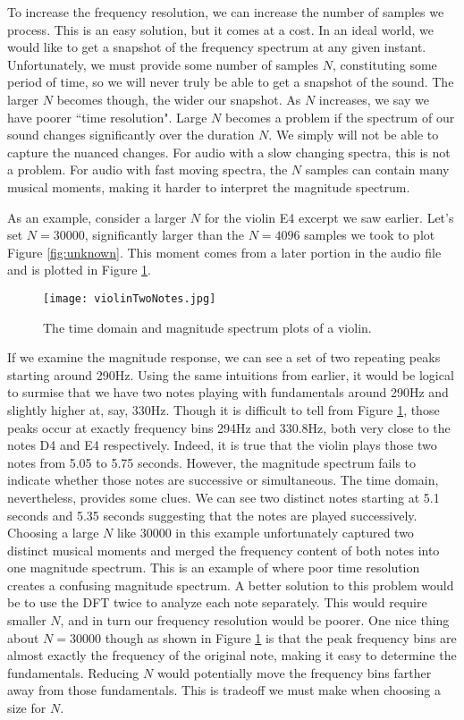 To increase the frequency resolution, we can increase the number of samples we process.  This is an easy solution,
but it comes at a cost.  In an ideal world, we would like to get a snapshot of the frequency spectrum at any given
instant.  Unfortunately, we must provide some number of samples $N$, constituting some period of time, so we
will never truly be able to get a snapshot of the sound.  The larger $N$ becomes though, the wider our snapshot.  
As $N$ increases, we say we have poorer ``time resolution".  Large $N$ becomes a problem if the spectrum of
our sound changes significantly over the duration $N$.  We simply will not be able to capture the nuanced changes.
For audio with a slow changing spectra, this is not a problem.  For audio with fast moving
spectra, the $N$ samples can contain many musical moments, making it harder to interpret the magnitude
spectrum.

As an example, consider a larger $N$ for the violin E4 excerpt we saw earlier.  Let's set $N =30000$, significantly larger
than the $N = 4096$ samples we took to plot Figure \ref{fig:unknown}.  This moment comes from a later portion in
the audio file and is plotted in Figure \ref{fig:violinTwoNotes}.

\begin{figure}[h]
	\caption{The time domain and magnitude spectrum plots of a violin.}
	\label{fig:violinTwoNotes}
	\begin{center}
		\texttt{[image: violinTwoNotes.jpg]}
	\end{center}
\end{figure}

If we examine the magnitude response, we can see a set of two repeating peaks starting around 290Hz.  Using the
same intuitions from earlier, it would be logical to surmise that we have two notes playing with fundamentals around
290Hz and slightly higher at, say, 330Hz.  Though it is difficult to tell from Figure \ref{fig:violinTwoNotes}, those peaks
occur at exactly frequency bins 294Hz and 330.8Hz, both very close to the notes D4 and E4 respectively.  Indeed, it is
true that the violin plays those two notes from 5.05 to 5.75 seconds.  However, the magnitude spectrum fails
to indicate whether those notes are successive or simultaneous.  
The time domain, nevertheless, provides some clues.  We 
can see two distinct notes starting at 5.1 seconds and 5.35 seconds suggesting 
that the notes are played successively.  Choosing a large $N$ like 30000 in this example
unfortunately captured two distinct musical moments and merged the frequency content of both notes into one 
magnitude spectrum.  This is an example of where poor time resolution creates a confusing magnitude spectrum.  
A better
solution to this problem would be to use the DFT twice to analyze each note separately.  This would require smaller $N$,
and in turn our frequency resolution would be poorer.  One nice thing about $N = 30000$ though as shown in 
Figure \ref{fig:violinTwoNotes} is that the peak frequency bins are almost exactly the frequency of the original note,
making it easy to determine the fundamentals.  Reducing $N$ would potentially move the frequency bins farther away
from those fundamentals.  This is tradeoff we must make when choosing a size for $N$.  

